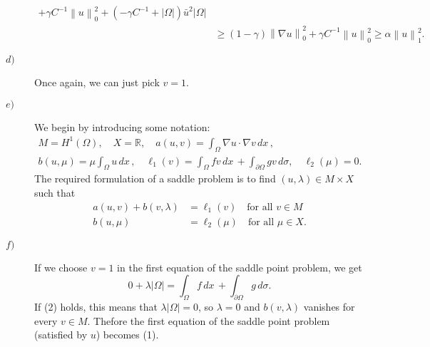 \documentclass[a4paper]{article}
\newcommand{\abs}[1]{\left\lvert#1\right\rvert}
\newcommand{\dx}{\, dx \,}
\newcommand{\dsigma}{\, d\sigma}
\newcommand{\norm}[1]{\left\lVert#1\right\rVert}
\newcommand{\R}{\mathbb{R}}
\begin{document}
\begin{description}
\begin{align*}
		+ \gamma C^{-1} \norm{u}_0^2
		+ (-\gamma C^{-1} + \abs{\Omega}) \bar{u}^2 \abs{\Omega} \\
&	\geq (1-\gamma) \norm{\nabla u}_0^2
		+ \gamma C^{-1} \norm{u}_0^2
	\geq \alpha \norm{u}_1^2.
	\end{align*}
\item[$d)$] Once again, we can just pick $v = 1$.
\item[$e)$] We begin by introducing some notation:
	\begin{gather*}
	M = H^1(\Omega),
	\quad X = \R,
	\quad a(u,v) = \int_\Omega \nabla u \cdot \nabla v \dx, \\
	b(u,\mu) = \mu \int_\Omega u \dx,
	\quad \ell_1(v) = \int_\Omega fv \dx + \int_{\partial \Omega} gv \dsigma,
	\quad \ell_2(\mu) = 0.
	\end{gather*}
	The required formulation of a saddle problem is to find
	$(u,\lambda) \in M \times X$ such that
	\begin{align*}
	a(u,v) + b(v,\lambda) &= \ell_1(v) \quad \text{for all } v \in M \\
	b(u,\mu) &= \ell_2(\mu) \quad \text{for all } \mu \in X.
	\end{align*}
\item[$f)$] If we choose $v = 1$ in the first equation of the saddle
	point problem, we get
	\[
	0 + \lambda \abs{\Omega} = \int_\Omega f \dx + \int_{\partial \Omega} g \dsigma.
	\]
	If (2) holds, this means that $\lambda \abs{\Omega} = 0$,
	so $\lambda = 0$ and $b(v,\lambda)$ vanishes for every $v \in M$.
	Thefore the first equation of the saddle point problem (satisfied by $u$)
	becomes (1).
\end{description}
\end{document}
